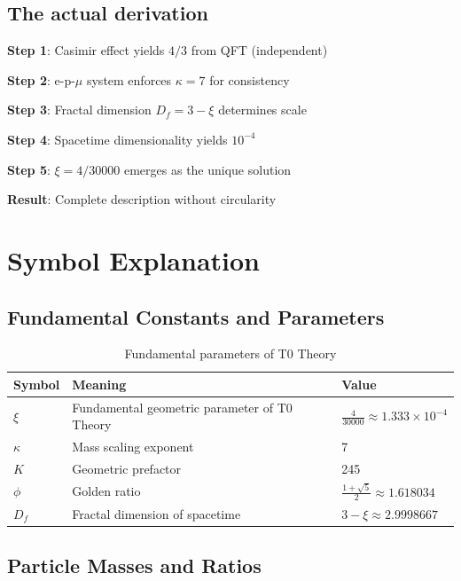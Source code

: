 	\subsection{The actual derivation}
	
	\begin{tcolorbox}[colback=green!5!white,colframe=green!75!black,title={Fundamental Derivation}]
		\textbf{Step 1}: Casimir effect yields $4/3$ from QFT (independent)
		
		\textbf{Step 2}: e-p-$\mu$ system enforces $\kappa = 7$ for consistency
		
		\textbf{Step 3}: Fractal dimension $D_f = 3 - \xi$ determines scale
		
		\textbf{Step 4}: Spacetime dimensionality yields $10^{-4}$
		
		\textbf{Step 5}: $\xi = 4/30000$ emerges as the unique solution
		
		\textbf{Result}: Complete description without circularity
	\end{tcolorbox}
	
\section{Symbol Explanation}
	
	\subsection{Fundamental Constants and Parameters}
	
	\begin{table}[htbp]
		\centering
		\begin{tabular}{p{3cm}p{8cm}p{3cm}}
			\toprule
			\textbf{Symbol} & \textbf{Meaning} & \textbf{Value} \\
			\midrule
			$\xi$ & Fundamental geometric parameter of T0 Theory & $\frac{4}{30000} \approx 1.333\times10^{-4}$ \\
			$\kappa$ & Mass scaling exponent & 7 \\
			$K$ & Geometric prefactor & 245 \\
			$\phi$ & Golden ratio & $\frac{1+\sqrt{5}}{2} \approx 1.618034$ \\
			$D_f$ & Fractal dimension of spacetime & $3 - \xi \approx 2.9998667$ \\
			\bottomrule
		\end{tabular}
		\caption{Fundamental parameters of T0 Theory}
	\end{table}
	
	\subsection{Particle Masses and Ratios}
	
